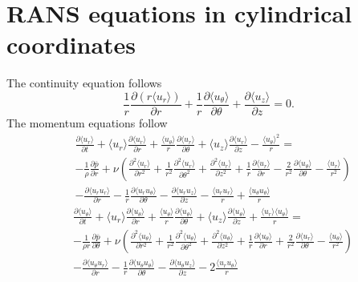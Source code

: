\documentclass[oneside,a4paper,11pt]{report}
\newcommand{\pavg}{\overline{p}}
\begin{document}
 \chapter{RANS equations in cylindrical coordinates}
The continuity equation follows
\begin{equation}
\frac{1}{r} \frac{\partial \left ( r \langle u_r \rangle \right )}{\partial r} + \frac{1}{r} \frac{\partial \langle u_\theta \rangle}{\partial \theta} + \frac{\partial \langle u_z \rangle}{\partial z} = 0.
\end{equation} 
The momentum equations follow
\begin{align}
&\frac{\partial \langle u_r \rangle}{\partial t} + \langle u_r \rangle \frac{\partial \langle u_r \rangle}{\partial r} + \frac{\langle u_\theta \rangle}{r} \frac{\partial \langle u_r \rangle}{\partial \theta} + \langle u_z \rangle \frac{\partial \langle u_r \rangle}{\partial z} - \frac{\langle u_\theta \rangle^2}{r} = \nonumber \\ 
&-\frac{1}{\rho} \frac{\partial \pavg}{\partial r} + \nu \left ( \frac{\partial^2 \langle u_r \rangle}{\partial r^2} + \frac{1}{r^2} \frac{\partial^2 \langle u_r \rangle}{\partial \theta^2} + \frac{\partial^2 \langle u_r \rangle}{\partial z^2} + \frac{1}{r} \frac{\partial \langle u_r \rangle}{\partial r} - \frac{2}{r^2} \frac{\partial \langle u_\theta \rangle }{\partial \theta} - \frac{\langle u_r \rangle}{r^2} \right ) \nonumber \\
&- \frac{\partial \langle u_ru_r \rangle}{\partial r} - \frac{1}{r} \frac{\partial \langle u_r u_\theta \rangle}{\partial \theta} - \frac{\partial \langle u_r u_z \rangle}{\partial z} - \frac{\langle u_ru_r \rangle}{r} + \frac{\langle u_\theta u_\theta \rangle}{r}
\end{align} 
\begin{align}
&\frac{\partial \langle u_\theta \rangle}{\partial t} + \langle u_r \rangle \frac{\partial \langle u_\theta \rangle}{\partial r} + \frac{\langle u_\theta \rangle}{r} \frac{\partial \langle u_\theta \rangle}{\partial \theta} + \langle u_z \rangle \frac{\partial \langle u_\theta \rangle}{\partial z} + \frac{\langle u_r \rangle \langle u_\theta\rangle}{r} = \nonumber \\ 
&-\frac{1}{\rho r} \frac{\partial \pavg}{\partial \theta} + \nu \left ( \frac{\partial^2 \langle u_\theta \rangle}{\partial r^2} + \frac{1}{r^2} \frac{\partial^2 \langle u_\theta \rangle}{\partial \theta^2} + \frac{\partial^2 \langle u_\theta \rangle}{\partial z^2} + \frac{1}{r} \frac{\partial \langle u_\theta \rangle}{\partial r} + \frac{2}{r^2} \frac{\partial \langle u_r \rangle }{\partial \theta} - \frac{\langle u_\theta \rangle}{r^2} \right ) \nonumber \\
&- \frac{\partial \langle u_\theta u_r \rangle}{\partial r} - \frac{1}{r} \frac{\partial \langle u_\theta u_\theta \rangle}{\partial \theta} - \frac{\partial \langle u_\theta u_z \rangle}{\partial z} - 2\frac{\langle u_ru_\theta \rangle}{r}
\end{align} 
\end{document}
